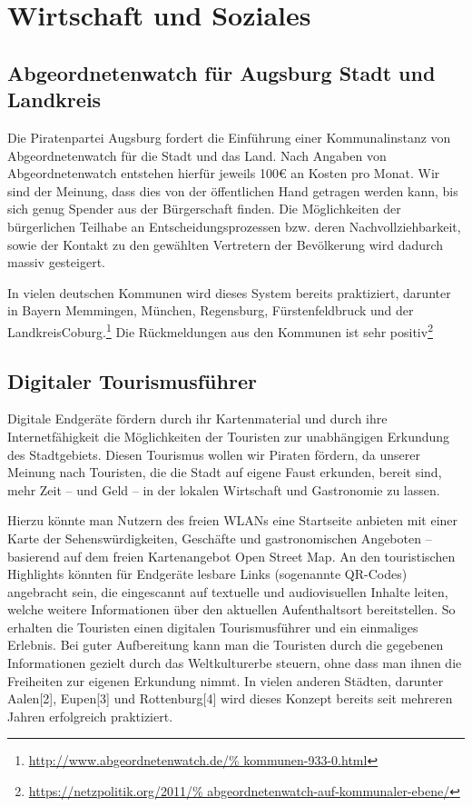 \chapter{Wirtschaft und Soziales}

  \section{Abgeordnetenwatch für Augsburg Stadt und Landkreis}
  
  Die Piratenpartei Augsburg fordert die Einführung einer Kommunalinstanz von 
  Abgeordnetenwatch für die Stadt und das Land. Nach Angaben von 
  Abgeordnetenwatch entstehen hierfür jeweils 100€ an Kosten pro Monat. Wir 
  sind der Meinung, dass dies von der öffentlichen Hand getragen werden kann, 
  bis sich genug Spender aus der Bürgerschaft finden. Die Möglichkeiten der 
  bürgerlichen Teilhabe an Entscheidungsprozessen bzw. deren 
  Nachvollziehbarkeit, sowie der Kontakt zu den gewählten Vertretern der 
  Bevölkerung wird dadurch massiv gesteigert. 
  
  In vielen deutschen Kommunen wird dieses System bereits praktiziert, 
  darunter in Bayern Memmingen, München, Regensburg, Fürstenfeldbruck und der 
  LandkreisCoburg.\footnote{\url{http://www.abgeordnetenwatch.de/%
  kommunen-933-0.html}} Die Rückmeldungen aus den Kommunen ist sehr 
  positiv\footnote{\url{https://netzpolitik.org/2011/%
  abgeordnetenwatch-auf-kommunaler-ebene/}}
  
  \section{Digitaler Tourismusführer}
  
  Digitale Endgeräte fördern durch ihr Kartenmaterial und durch ihre 
  Internetfähigkeit die Möglichkeiten der Touristen zur unabhängigen Erkundung 
  des Stadtgebiets. Diesen Tourismus wollen wir Piraten fördern, da unserer 
  Meinung nach Touristen, die die Stadt auf eigene Faust erkunden, bereit 
  sind, mehr Zeit – und Geld – in der lokalen Wirtschaft und Gastronomie zu 
  lassen.
  
  Hierzu könnte man Nutzern des freien WLANs eine Startseite anbieten mit 
  einer Karte der Sehenswürdigkeiten, Geschäfte und gastronomischen Angeboten 
  – basierend auf dem freien Kartenangebot Open Street Map. An den 
  touristischen Highlights könnten für Endgeräte lesbare Links (sogenannte 
  QR-Codes) angebracht sein, die eingescannt auf textuelle und audiovisuellen 
  Inhalte leiten, welche weitere Informationen über den aktuellen 
  Aufenthaltsort bereitstellen. So erhalten die Touristen einen digitalen 
  Tourismusführer und ein einmaliges Erlebnis. Bei guter Aufbereitung kann man 
  die Touristen durch die gegebenen Informationen gezielt durch das 
  Weltkulturerbe steuern, ohne dass man ihnen die Freiheiten zur eigenen 
  Erkundung nimmt. In vielen anderen Städten, darunter Aalen[2], Eupen[3] und 
  Rottenburg[4] wird dieses Konzept bereits seit mehreren Jahren erfolgreich 
  praktiziert.
  
